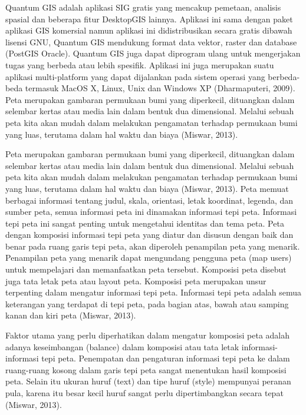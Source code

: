 Quantum GIS adalah aplikasi SIG gratis yang mencakup pemetaan, analisis spasial dan beberapa fitur DesktopGIS lainnya. Aplikasi ini sama dengan paket aplikasi GIS komersial namun aplikasi ini didistribusikan secara gratis dibawah lisensi GNU, Quantum GIS mendukung format data vektor, raster dan database (PostGIS Oracle). Quantum GIS juga dapat diprogram ulang untuk mengerjakan tugas yang berbeda atau lebih spesifik. Aplikasi ini juga merupakan suatu aplikasi multi-platform yang dapat dijalankan pada sistem operasi yang berbeda-beda termasuk MacOS X, Linux, Unix dan Windows XP (Dharmaputeri, 2009).
Peta merupakan gambaran permukaan bumi yang diperkecil, dituangkan dalam selembar kertas atau media lain dalam bentuk dua dimensional. Melalui sebuah peta kita akan mudah dalam melakukan pengamatan terhadap permukaan bumi yang luas, terutama dalam hal waktu dan biaya (Miswar, 2013).

Peta merupakan gambaran permukaan bumi yang diperkecil, dituangkan dalam selembar kertas atau media lain dalam bentuk dua dimensional. Melalui sebuah peta kita akan mudah dalam melakukan pengamatan terhadap permukaan bumi yang luas, terutama dalam hal waktu dan biaya (Miswar, 2013).
Peta memuat berbagai informasi tentang judul, skala, orientasi, letak koordinat, legenda, dan sumber peta, semua informasi peta ini dinamakan informasi tepi peta. Informasi tepi peta ini sangat penting untuk mengetahui identitas dan tema peta. Peta dengan komposisi informasi tepi peta yang diatur dan disusun dengan baik dan benar pada ruang garis tepi peta, akan diperoleh penampilan peta yang menarik. Penampilan peta yang menarik dapat mengundang pengguna peta (map users) untuk mempelajari dan memanfaatkan peta tersebut. Komposisi peta disebut juga tata letak peta atau layout peta. Komposisi peta merupakan unsur terpenting dalam mengatur informasi tepi peta. Informasi tepi peta adalah semua keterangan yang terdapat di tepi peta, pada bagian atas, bawah atau samping kanan dan kiri peta (Miswar, 2013).

Faktor utama yang perlu diperhatikan dalam mengatur komposisi peta adalah adanya keseimbangan (balance) dalam komposisi atau tata letak informasi-informasi tepi peta. Penempatan dan pengaturan informasi tepi peta ke dalam ruang-ruang kosong dalam garis tepi peta sangat menentukan hasil komposisi peta. Selain itu ukuran huruf (text) dan tipe huruf (style) mempunyai peranan pula, karena itu besar kecil huruf sangat perlu dipertimbangkan secara tepat (Miswar, 2013).
